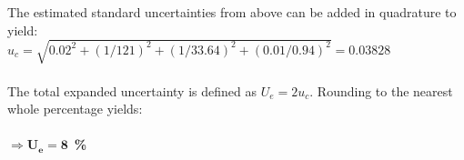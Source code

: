 \documentclass[12pt]{article}
\begin{document}
\\~\\
The estimated standard uncertainties from above can be added in quadrature to yield:\\
$u_c=\sqrt{0.02^2+(1/121)^2+(1/33.64)^2+(0.01/0.94)^2}=0.03828$ 
\\~\\
The total expanded uncertainty is defined as $U_e=2u_c$. Rounding to the nearest whole percentage yields: 
\\~\\
\large
\indent $\boldsymbol{\Rightarrow U_{e}=8}$~\textbf{\%}
\end{document}
